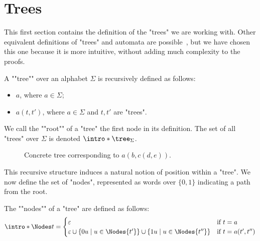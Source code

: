 \documentclass[a4paper,UKenglish,cleveref, autoref, thm-restate]{lipics-v2021}
\begin{document}
\section{Trees}\label{sec:trees}

This first section contains the definition of the "trees" we are working with. Other equivalent definitions of "trees" and
automata are possible~\cite{Thomas1997, tata}, but we have chosen this one because it is more intuitive, without adding much complexity to the proofs.

\begin{definition}["Tree"]
	\AP A ""tree"" over an alphabet $\Sigma$ is recursively defined as follows:
	\begin{itemize}
		\item $a$, where $a \in \Sigma$;
		\item $a(t,t')$, where $a \in \Sigma$ and $t, t'$ are "trees".
	\end{itemize}
	We call the ""root"" of a "tree" the first node in its definition.
	The set of all "trees" over $\Sigma$ is denoted $\intro* \tree_{\Sigma}$.
\end{definition}

\begin{figure}[h]
	\centering


	\caption{Concrete tree corresponding to $a(b, c(d, e))$.}
\end{figure}

This recursive structure induces a natural notion of position within a "tree". We now define the set of "nodes",
represented as words over $\{0,1\}$ indicating a path from the root.

\begin{definition}["Nodes"]
	\AP The ""nodes"" of a "tree" are defined as follows:
	\[
		\intro* \Nodes t =
		\begin{cases}
			\varepsilon                             & \text{if } t = a         \\
			\varepsilon \cup \setdef {0u} {u \in \Nodes {t'}}
			\cup \setdef {1u} {u \in \Nodes {t''} } & \text{if } t = a(t',t'')
		\end{cases}
	\]
\end{definition}
\end{document}
